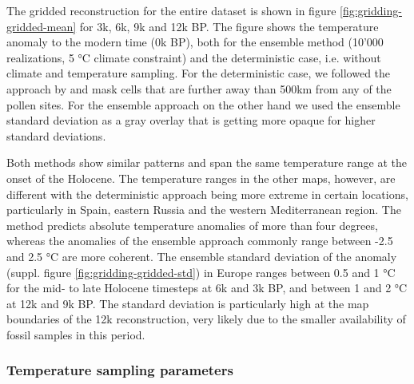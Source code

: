 \begin{refsection}
The gridded reconstruction for the entire dataset is shown in figure \ref{fig:gridding-gridded-mean} for 3k, 6k, 9k and 12k BP. The figure shows the temperature anomaly to the modern time (0k BP), both for the ensemble method (10'000 realizations, 5 °C climate constraint) and the deterministic case, i.e. without climate and temperature sampling. For the deterministic case, we followed the approach by \cite{MauriDavisCollinsEtAl2015} and mask cells that are further away than 500km from any of the pollen sites. For the ensemble approach on the other hand we used the ensemble standard deviation as a gray overlay that is getting more opaque for higher standard deviations.

Both methods show similar patterns and span the same temperature range at the onset of the Holocene. The temperature ranges in the other maps, however, are different with the deterministic approach being more extreme in certain locations, particularly in Spain, eastern Russia and the western Mediterranean region. The method predicts absolute temperature anomalies of more than four degrees, whereas the anomalies of the ensemble approach commonly range between -2.5 and 2.5 °C are more coherent. The ensemble standard deviation of the anomaly (suppl. figure \ref{fig:gridding-gridded-std}) in Europe ranges between 0.5 and 1 °C for the mid- to late Holocene timesteps at 6k and 3k BP, and between 1 and 2 °C at 12k and 9k BP. The standard deviation is particularly high at the map boundaries of the 12k reconstruction, very likely due to the smaller availability of fossil samples in this period.


\subsubsection{Temperature sampling parameters}


\end{refsection}
